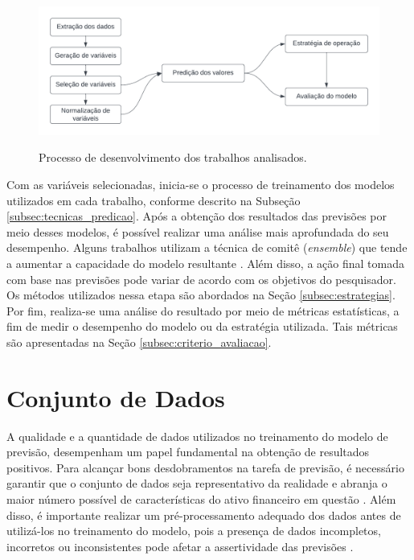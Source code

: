 \begin{figure}[htbp]
    \caption{Processo de desenvolvimento dos trabalhos analisados.}
      \centering
      \includegraphics[width=.9\linewidth]{sections/images/fluxo_abordagem.png} 
    \label{fig:abordagemPadrao}
\end{figure}

Com as variáveis selecionadas, inicia-se o processo de treinamento dos modelos utilizados em cada trabalho, conforme descrito na Subseção \ref{subsec:tecnicas_predicao}. Após a obtenção dos resultados das previsões por meio desses modelos, é possível realizar uma análise mais aprofundada do seu desempenho. Alguns trabalhos utilizam a técnica de comitê (\textit{ensemble}) que tende a aumentar a capacidade do modelo resultante \cite{sagi2018ensemble}. Além disso, a ação final tomada com base nas previsões pode variar de acordo com os objetivos do pesquisador. Os métodos utilizados nessa etapa são abordados na Seção \ref{subsec:estrategias}. Por fim, realiza-se uma análise do resultado por meio de métricas estatísticas, a fim de medir o desempenho do modelo ou da estratégia utilizada. Tais métricas são apresentadas na Seção \ref{subsec:criterio_avaliacao}. 



\section{Conjunto de Dados}
\label{subsec:conjunto_dados}
A qualidade e a quantidade de dados utilizados no treinamento do modelo de previsão, desempenham um papel fundamental na obtenção de resultados positivos. Para alcançar bons desdobramentos na tarefa de previsão, é necessário garantir que o conjunto de dados seja representativo da realidade e abranja o maior número possível de características do ativo financeiro em questão \cite{kumar2020data}. Além disso, é importante realizar um pré-processamento adequado dos dados antes de utilizá-los no treinamento do modelo, pois a presença de dados incompletos, incorretos ou inconsistentes pode afetar a assertividade das previsões \cite{kaur2019systematic}.

